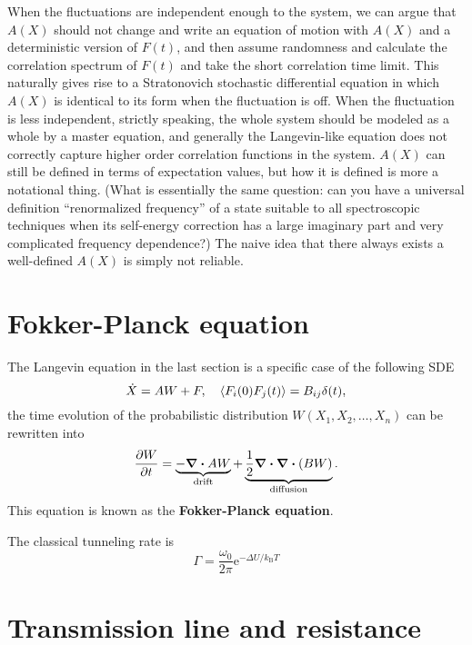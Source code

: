 \documentclass[hyperref, a4paper]{article}
\newcommand*{\ee}{\mathrm{e}}
\newcommand*{\concept}[1]{{\textbf{#1}}}
\newcommand*{\kB}{k_{\text{B}}}
\begin{document}
When the fluctuations are independent enough to the system,
we can argue that $A(X)$ should not change and write an equation of motion with
$A(X)$ and a deterministic version of $F(t)$,
and then assume randomness and calculate the correlation spectrum of $F(t)$
and take the short correlation time limit.
This naturally gives rise to a Stratonovich stochastic differential equation
in which $A(X)$ is identical to its form when the fluctuation is off.
When the fluctuation is less independent,
strictly speaking, the whole system should be modeled as a whole by a master equation,
and generally the Langevin-like equation does not correctly capture
higher order correlation functions in the system.
$A(X)$ can still be defined in terms of expectation values,
but how it is defined is more a notational thing.
(What is essentially the same question:
can you have a universal definition ``renormalized frequency'' of a state 
suitable to all spectroscopic techniques
when its self-energy correction has a large imaginary part and very complicated frequency dependence?)
The naive idea that there always exists a well-defined $A(X)$
is simply not reliable.

\section{Fokker-Planck equation}

The Langevin equation in the last section is a specific case of the following SDE 
\begin{equation}
    \dot{X} = A W + F, \quad 
    \expval{F_i(0) F_j(t)} = B_{ij} \delta(t),
\end{equation}
the time evolution of the probabilistic distribution $W(X_1, X_2, \ldots, X_n)$ 
can be rewritten into  
\begin{equation}
    \pdv{W}{t} = \underbrace{
        - \div{A W}
    }_{\text{drift}} + 
    \underbrace{
        \frac{1}{2} \div \div (B W)
    }_{\text{diffusion}} . 
\end{equation}
This equation is known as the \concept{Fokker-Planck equation}.

The classical tunneling rate is 
\begin{equation}
    \Gamma = \frac{\omega_0}{2\pi} \ee^{- \Delta U / \kB T}
\end{equation}

\section{Transmission line and resistance}
\end{document}
